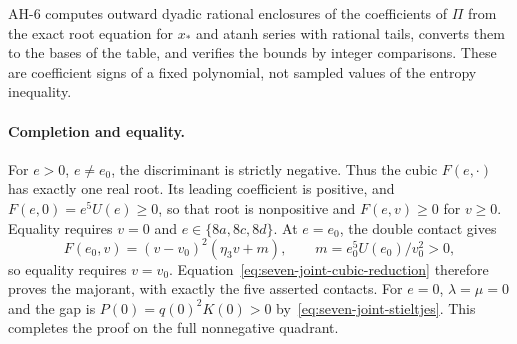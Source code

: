 AH-6 computes outward dyadic rational enclosures of the coefficients of $\Pi$ from the exact root
equation for $x_*$ and atanh series with rational tails, converts them to the bases of the table, and
verifies the bounds by integer comparisons. These are coefficient signs of a fixed polynomial, not sampled
values of the entropy inequality.

\paragraph{Completion and equality.}
For $e>0$, $e\ne e_0$, the discriminant is strictly negative. Thus the
cubic $F(e,\cdot)$ has exactly one real root. Its leading coefficient
is positive, and $F(e,0)=e^5U(e)\ge0$, so that root is nonpositive
and $F(e,v)\ge0$ for $v\ge0$. Equality requires $v=0$ and
$e\in\{8a,8c,8d\}$.
At $e=e_0$, the double contact gives
\[
 F(e_0,v)=(v-v_0)^2(\eta_3v+m),\qquad
 m=e_0^5U(e_0)/v_0^2>0,
\]
so equality requires $v=v_0$. Equation~\eqref{eq:seven-joint-cubic-reduction}
therefore proves the majorant, with exactly the five asserted contacts.
For $e=0$, $\lambda=\mu=0$ and the gap is $P(0)=q(0)^2K(0)>0$
by~\eqref{eq:seven-joint-stieltjes}.
This completes the proof on the full nonnegative quadrant.
